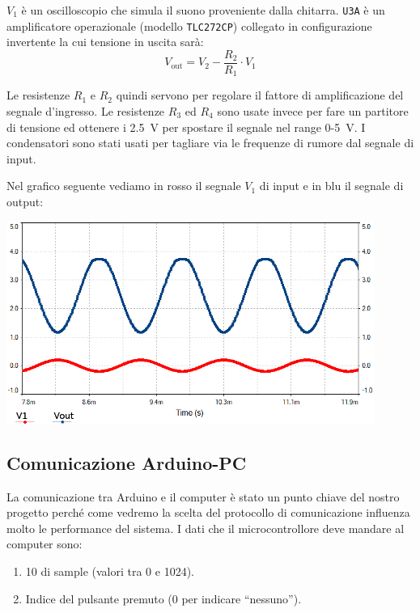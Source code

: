 \documentclass[a4paper,11pt]{article}
\begin{document}
$V_1$ è un oscilloscopio che simula il suono proveniente dalla chitarra. \texttt{U3A} è un amplificatore operazionale (modello \texttt{TLC272CP}) collegato in configurazione invertente la cui tensione in uscita sarà: $$V_{\mathrm{out}} = V_2 - \frac{R_2}{R_1} \cdot V_1$$

Le resistenze $R_1$ e $R_2$ quindi servono per regolare il fattore di amplificazione del segnale d'ingresso. Le resistenze $R_3$ ed $R_4$ sono usate invece per fare un partitore di tensione ed ottenere i \SI{2.5}{\volt} per spostare il segnale nel range \num{0}-\SI{5}{\volt}. I condensatori sono stati usati per tagliare via le frequenze di rumore dal segnale di input.

\newpage
Nel grafico seguente vediamo in rosso il segnale $V_1$ di input e in blu il segnale di output:
\vspace{0.1in}

\begin{center}
\includegraphics[width=0.9\textwidth]{screen2.png}
\end{center}

\subsection{Comunicazione Arduino-PC}
La comunicazione tra Arduino e il computer è stato un punto chiave del nostro progetto perché come vedremo la scelta del protocollo di comunicazione influenza molto le performance del sistema. I dati che il microcontrollore deve mandare al computer sono:
\begin{enumerate}
    \item \SI{10}{\bit} di sample (valori tra \num{0} e \num{1024}).
    \item Indice del pulsante premuto (\num{0} per indicare ``nessuno'').
\end{enumerate}
\end{document}
